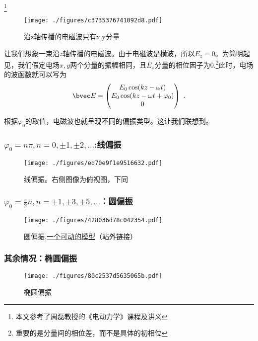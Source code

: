 
\begin{issues}
\issueDraft
\end{issues}

\footnote{本文参考了周磊教授的《电动力学》课程及讲义}

\begin{figure}[ht]
\centering
\texttt{[image: ./figures/c3735376741092d8.pdf]}
\caption{沿z轴传播的电磁波只有x,y分量} \label{fig_PLREMW_1}
\end{figure}

让我们想象一束沿$z$轴传播的电磁波。由于电磁波是横波，所以$E_z=0$。为简明起见，我们假定电场$x,y$两个分量的振幅相同，且$E_x$分量的相位因子为0.\footnote{重要的是分量间的相位差，而不是具体的初相位}此时，电场的波函数就可以写为
\begin{equation}
\bvec E = 
\begin{pmatrix}
E_{0} \cos(kz - \omega t)\\
E_{0} \cos(kz - \omega t+\varphi_{0})\\
0\\
\end{pmatrix}~.
\end{equation}

根据$\varphi_0$的取值，电磁波也就呈现不同的偏振类型。这让我们联想到。

\subsubsection{$\varphi_0=n\pi, n=0,\pm1,\pm2,...$:线偏振}
\begin{figure}[ht]
\centering
\texttt{[image: ./figures/ed70e9f1e9516632.pdf]}
\caption{线偏振。右侧图像为俯视图，下同} \label{fig_PLREMW_2}
\end{figure}

\subsubsection{$\varphi_0=\frac{\pi}{2}n, n=\pm1,\pm3,\pm5,...$：圆偏振}
\begin{figure}[ht]
\centering
\texttt{[image: ./figures/428036d78c042354.pdf]}
\caption{圆偏振,\href{https://www.geogebra.org/m/hj6qsfdu}{一个可动的模型}（站外链接）} \label{fig_PLREMW_3}
\end{figure}

\subsubsection{其余情况：椭圆偏振}
\begin{figure}[ht]
\centering
\texttt{[image: ./figures/80c2537d5635065b.pdf]}
\caption{椭圆偏振} \label{fig_PLREMW_4}
\end{figure}

